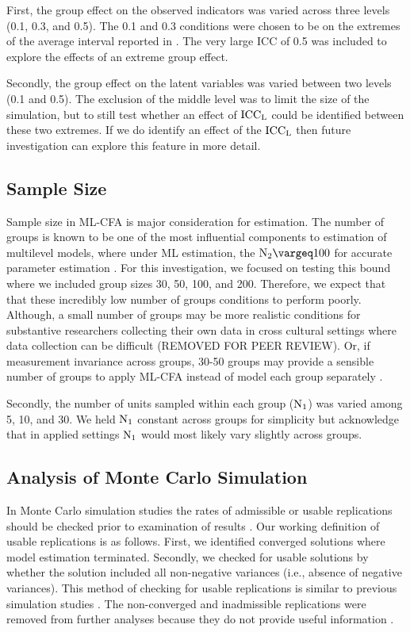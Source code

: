 \documentclass[Review,sageh,times, doublespace]{sagej}
\renewcommand{\geq}{\vargeq}
\begin{document}
First, the group effect on the observed indicators was varied across three levels (0.1, 0.3, and 0.5).
The 0.1 and 0.3 conditions were chosen to be on the extremes of the average interval reported in \cite{Hedges2007}. 
The very large ICC of 0.5 was included to explore the effects of an extreme group effect.

Secondly, the group effect on the latent variables was varied between two levels (0.1 and 0.5).
The exclusion of the middle level was to limit the size of the simulation, but to still test whether an effect of $\rm ICC_L$ could be identified between these two extremes.
If we do identify an effect of the $\rm ICC_L$ then future investigation can explore this feature in more detail.

\subsection{Sample Size}

Sample size in ML-CFA is major consideration for estimation.
The number of groups is known to be one of the most influential components to estimation of multilevel models, where under ML estimation, the $\rm N_2 \geq 100$ for accurate parameter estimation \citep{Hox2001}.
For this investigation, we focused on testing this bound where we included group sizes 30, 50, 100, and 200.
Therefore, we expect that that these incredibly low number of groups conditions to perform poorly.
Although, a small number of groups may be more realistic conditions for substantive researchers collecting their own data in cross cultural settings where data collection can be difficult (REMOVED FOR PEER REVIEW).%
Or, if measurement invariance across groups, 30-50 groups may provide a sensible number of groups to apply ML-CFA instead of model each group separately \citep{Kim2017}.

Secondly, the  number of units sampled within each group ($\rm N_1$) was varied among 5, 10, and 30. 
We held $\rm N_1$ constant across groups for simplicity but acknowledge that in applied settings $\rm N_1$ would most likely vary slightly across groups.

\subsection{Analysis of Monte Carlo Simulation}
In Monte Carlo simulation studies the rates of admissible or usable replications should be checked prior to examination of results \citep{Bandalos2012, Bandalos2013}.
Our working definition of usable replications is as follows.
First, we identified converged solutions where model estimation terminated.
Secondly, we checked for usable solutions by whether the solution included all non-negative variances (i.e., absence of negative variances).
This method of checking for usable replications is similar to previous simulation studies \citep{Flora2004, Yang2010, DiStefano2014}.
The non-converged and inadmissible replications were removed from further analyses because they do not provide useful information \citep{Bandalos2012, Bandalos2013}.
\end{document}
